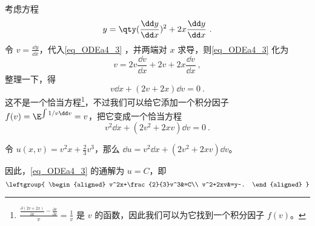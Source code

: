 \begin{example}{}\label{ex_ODEa4_2}


考虑方程
\begin{equation}\label{eq_ODEa4_3}
y=\qty(\frac{\dd y}{\dd x})^2+2x\frac{\dd y}{\dd x}~.
\end{equation}
令 $v=\frac{\dd y}{\dd x}$，代入\autoref{eq_ODEa4_3} ，并两端对 $x$ 求导，则\autoref{eq_ODEa4_3} 化为
\begin{equation}
v=2v\frac{\dd v}{\dd x}+2v+2x\frac{\dd v}{\dd x}~,
\end{equation}
整理一下，得
\begin{equation}
v\dd x+(2v+2x)\dd v=0~.
\end{equation}
这不是一个恰当方程\footnote{$\frac{\frac{\partial (2v+2x)}{\partial x}-\frac{\partial v}{\partial v}}{v}=\frac{1}{v}$ 是 $v$ 的函数，因此我们可以为它找到一个积分因子 $f(v)$。}，不过我们可以给它添加一个积分因子 $f(v)=\E^{\int 1/v \dd v}=v$，把它变成一个恰当方程
\begin{equation}
v^2\dd x+(2v^2+2xv)\dd v=0~.
\end{equation}

令 $u(x, v)=v^2x+\frac{2}{3}v^3$，那么 $\dd u=v^2\dd x+(2v^2+2xv)\dd v$。

因此，\autoref{eq_ODEa4_3} 的通解为 $u=C$，即
\begin{equation}
\leftgroup{
    \begin{aligned}
    v^2x+\frac{2}{3}v^3&=C\\
    v^2+2xv&=y~.
    \end{aligned}
}
\end{equation}



\end{example}



